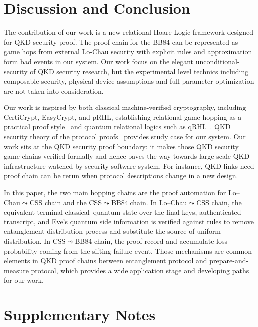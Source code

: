 \documentclass[conference,compsoc]{IEEEtran}
\newcommand{\bb}{\textsf{BB84}\xspace}
\newcommand{\qrhl}{\textsf{qRHL}\xspace}
\begin{document}
\section{Discussion and Conclusion}

The contribution of our work is a new relational Hoare Logic framework designed for QKD security proof. The proof chain for the \bb can be represented as game hops from external Lo-Chau security with explicit rules and approximation form bad events in our system. Our work focus on the elegant unconditional-security of QKD security research, but the experimental level technics including composable security, physical-device assumptions and full parameter optimization are not taken into consideration. 

Our work is inspired by both classical machine-verified cryptography, including CertiCrypt, EasyCrypt, and pRHL, establishing relational game hopping as a practical proof style~\cite{barthe2009formal,barthe2011computer,barthe2012probabilistic,easycrypt} and quantum relational logics such as \qrhl~\cite{unruh2019qrhl,barthe2020relational,li2021expectation,barthe2025complete}. QKD security theory of the protocol proofs~\cite{calderbank1996good,steane1996multiple,lochau1999unconditional,shor2000simple,mayers2001unconditional} provides study case for our system. Our work sits at the QKD security proof boundary: it makes those QKD security game chains verified formally and hence paves the way towards large-scale QKD infrastructure watched by security software system. For instance, QKD links need proof chain can be rerun when protocol descriptions change in a new design. 

In this paper, the two main hopping chains are the proof automation for Lo--Chau$\leadsto$CSS chain and the CSS$\leadsto$\bb chain. In Lo--Chau$\leadsto$CSS chain, the equivalent terminal classical--quantum state over the final keys, authenticated transcript, and Eve's quantum side information is verified against rules to remove entanglement distribution process and substitute the source of uniform distribution. In CSS$\leadsto$\bb chain, the proof record and accumulate loss-probability coming from the sifting failure event. Those mechanisms are common elements in QKD proof chains between entanglement protocol and prepare-and-measure protocol, which provides a wide application stage and developing paths for our work.


\appendices

\section{Supplementary Notes}
\label{app:supplementary}
\end{document}
